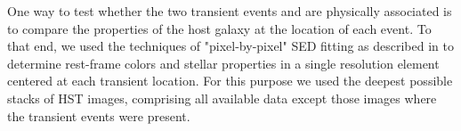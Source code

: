 \label{sec:Host}
One way to test whether the two transient events \spockone and \spocktwo are physically associated is to compare the properties of the \spock host galaxy at the location of each event.   To that end, we used the techniques of "pixel-by-pixel" SED fitting as described in \citet{Hemmati:2014} to determine rest-frame colors and stellar properties in a single resolution element centered at each transient location.  For this purpose we used the deepest possible stacks of HST images, comprising all available data except those images where the transient events were present. 